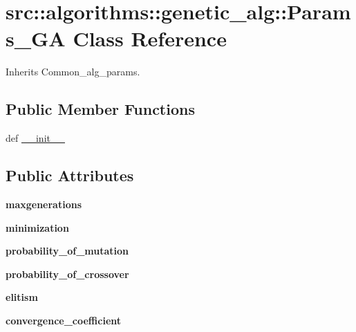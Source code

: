 \hypertarget{classsrc_1_1algorithms_1_1genetic__alg_1_1Params__GA}{
\section{src::algorithms::genetic\_\-alg::Params\_\-GA Class Reference}
\label{classsrc_1_1algorithms_1_1genetic__alg_1_1Params__GA}
}


Inherits Common\_\-alg\_\-params.

\subsection*{Public Member Functions}
\begin{DoxyCompactItemize}
\item 
def \hyperlink{classsrc_1_1algorithms_1_1genetic__alg_1_1Params__GA_a87da62f905026bf8cc8686920e564ca1}{\_\-\_\-init\_\-\_\-}
\end{DoxyCompactItemize}
\subsection*{Public Attributes}
\begin{DoxyCompactItemize}
\item 
\hypertarget{classsrc_1_1algorithms_1_1genetic__alg_1_1Params__GA_ad22cd0a6f7ecffd3d4ec7fc538507b2b}{
{\bfseries maxgenerations}}
\label{classsrc_1_1algorithms_1_1genetic__alg_1_1Params__GA_ad22cd0a6f7ecffd3d4ec7fc538507b2b}

\item 
\hypertarget{classsrc_1_1algorithms_1_1genetic__alg_1_1Params__GA_ad6ae1a861a9cd985a6847bbd09310f0e}{
{\bfseries minimization}}
\label{classsrc_1_1algorithms_1_1genetic__alg_1_1Params__GA_ad6ae1a861a9cd985a6847bbd09310f0e}

\item 
\hypertarget{classsrc_1_1algorithms_1_1genetic__alg_1_1Params__GA_aa9da07255dd6a3b147412ec170925377}{
{\bfseries probability\_\-of\_\-mutation}}
\label{classsrc_1_1algorithms_1_1genetic__alg_1_1Params__GA_aa9da07255dd6a3b147412ec170925377}

\item 
\hypertarget{classsrc_1_1algorithms_1_1genetic__alg_1_1Params__GA_ae261a91cdfe78fe7d2d65efc2ed9edc8}{
{\bfseries probability\_\-of\_\-crossover}}
\label{classsrc_1_1algorithms_1_1genetic__alg_1_1Params__GA_ae261a91cdfe78fe7d2d65efc2ed9edc8}

\item 
\hypertarget{classsrc_1_1algorithms_1_1genetic__alg_1_1Params__GA_a719b13116c6bf801a8350a2ec8932bb8}{
{\bfseries elitism}}
\label{classsrc_1_1algorithms_1_1genetic__alg_1_1Params__GA_a719b13116c6bf801a8350a2ec8932bb8}

\item 
\hypertarget{classsrc_1_1algorithms_1_1genetic__alg_1_1Params__GA_a21b50b67485ac38955a046bbafd32929}{
{\bfseries convergence\_\-coefficient}}
\label{classsrc_1_1algorithms_1_1genetic__alg_1_1Params__GA_a21b50b67485ac38955a046bbafd32929}

\end{DoxyCompactItemize}


